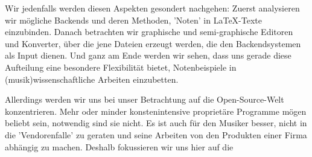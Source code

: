 Wir jedenfalls werden diesen Aspekten gesondert nachgehen: Zuerst analysieren
wir mögliche Backends und deren Methoden, 'Noten' in \LaTeX-Texte einzubinden.
Danach betrachten wir graphische und semi-graphische Editoren und Konverter,
über die jene Dateien erzeugt werden, die den Backendsystemen als Input dienen.
Und ganz am Ende werden wir sehen, dass uns gerade diese Aufteilung eine
besondere Flexibilität bietet, Notenbeispiele in (musik)wissenschaftliche
Arbeiten einzubetten.

Allerdings werden wir uns bei unser Betrachtung auf die Open-Source-Welt
konzentrieren. Mehr oder minder konstenintensive proprietäre Programme mögen
beliebt sein, notwendig sind sie nicht. Es ist auch für den Musiker besser,
nicht in die 'Vendorenfalle' zu geraten und seine Arbeiten von den Produkten
einer Firma abhängig zu machen. Deshalb fokussieren wir uns hier auf die
